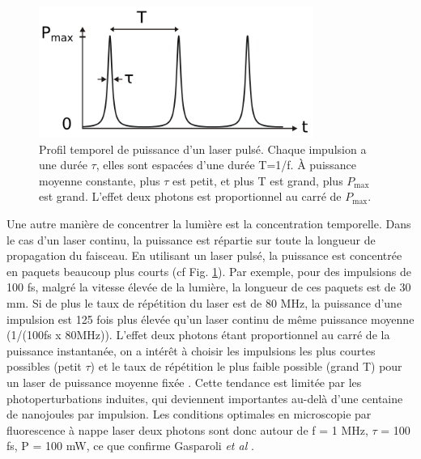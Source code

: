 \begin{figure}
    \centering
    \includegraphics[width=0.8\textwidth]{./files/pulsed_laser.svg.png}
    \caption{Profil temporel de puissance d'un laser pulsé. Chaque impulsion a une durée $\tau$, elles sont espacées d'une durée T=1/f. À puissance moyenne constante, plus $\tau$ est petit, et plus T est grand, plus $P_\text{max}$ est grand. L'effet deux photons est proportionnel au carré de $P_\text{max}$.
    }
    \label{pulsed-laser}
    \end{figure}
    
Une autre manière de concentrer la lumière est la concentration temporelle. Dans le cas d'un laser continu, la puissance est répartie sur toute la longueur de propagation du faisceau. En utilisant un laser pulsé, la puissance est concentrée en paquets beaucoup plus courts (cf Fig. \ref{pulsed-laser}). Par exemple, pour des impulsions de 100 fs, malgré la vitesse élevée de la lumière, la longueur de ces paquets est de 30 mm. Si de plus le taux de répétition du laser est de 80 MHz, la puissance d'une impulsion est 125 fois plus élevée qu'un laser continu de même puissance moyenne (1/(100fs x 80MHz)). L'effet deux photons étant proportionnel au carré de la puissance instantanée, on a intérêt à choisir les impulsions les plus courtes possibles (petit $\tau$) et le taux de répétition le plus faible possible (grand T) pour un laser de puissance moyenne fixée \cite{maioli_fast_2020}. Cette tendance est limitée par les photoperturbations induites, qui deviennent importantes au-delà d'une centaine de nanojoules par impulsion. Les conditions optimales en microscopie par fluorescence à nappe laser deux photons sont donc autour de f = 1 MHz, $\tau$ = 100 fs, P = 100 mW, ce que confirme Gasparoli \emph{et al} \cite{gasparoli_is_2020}. %



